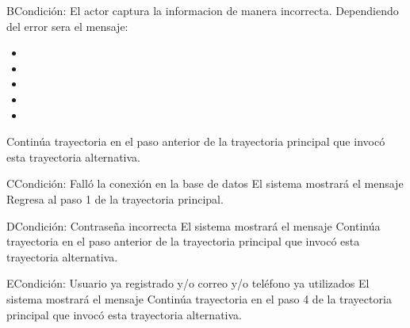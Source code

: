 	\begin{UCtrayectoriaA}{B}{Condición: El actor captura la informacion de manera incorrecta.}
		\UCpaso[\UCsist] Dependiendo del error sera el mensaje:
			\begin{itemize}
			\item {}
			\item {}
			\item {}
			\item {}
			\item {}
			\end{itemize}
		\UCpaso[\UCsist] Continúa trayectoria en el paso anterior de la trayectoria principal que invocó esta trayectoria alternativa. 
	\end{UCtrayectoriaA}
	\begin{UCtrayectoriaA}{C}{Condición: Falló la conexión en la base de datos}
		\UCpaso[\UCsist] El sistema mostrará el mensaje 
		\UCpaso[\UCsist] Regresa al paso 1 de la trayectoria principal. 
	\end{UCtrayectoriaA}
	\begin{UCtrayectoriaA}{D}{Condición: Contraseña incorrecta}
		\UCpaso[\UCsist] El sistema mostrará el mensaje 
		\UCpaso[\UCsist] Continúa trayectoria en el paso anterior de la trayectoria  principal que invocó esta trayectoria alternativa. 
	\end{UCtrayectoriaA}
	\begin{UCtrayectoriaA}{E}{Condición: Usuario ya registrado y/o correo y/o teléfono ya utilizados}
		\UCpaso[\UCsist] El sistema mostrará el mensaje 
		\UCpaso[\UCsist] Continúa trayectoria en el paso 4 de la trayectoria  principal que invocó esta trayectoria alternativa. 
	\end{UCtrayectoriaA}
